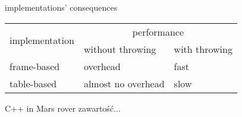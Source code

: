 \documentclass[10pt]{beamer}
\begin{document}
\begin{frame}{implementations' consequences}
	\centering
	\begin{tabular}{p{3cm}|p{3cm}|p{3cm}}
		\multirow{2}{*}{implementation}& \multicolumn{2}{c}{performance} \\
		& without throwing & with throwing  \\ \hline \hline
		frame-based  & overhead & fast \\ \hline
		table-based & almost no overhead & slow \\ \hline
	\end{tabular}
\end{frame}

\begin{frame}{C++ in Mars rover}
	zawartość...
\end{frame}
	
\end{document}
